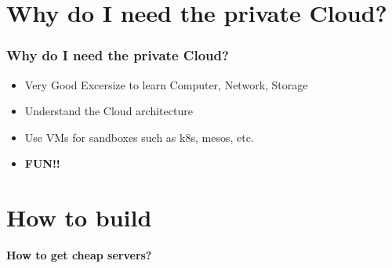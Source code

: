 \documentclass[aspectratio=169,11pt,hyperref={colorlinks=true}]{beamer}
\begin{document}
\section{Why do I need the private Cloud?}
\begin{frame}
  \frametitle{Why do I need the private Cloud?}
  \begin{itemize}
    \item Very Good Excersize to learn Computer, Network, Storage
    \item Understand the Cloud architecture
    \item Use VMs for sandboxes such as k8s, mesos, etc.
    \item \bf{FUN!!}
  \end{itemize}
\end{frame}

\section{How to build}
\begin{frame}
  \Huge{\bf{How to get cheap servers?}}
\end{frame}
\end{document}
